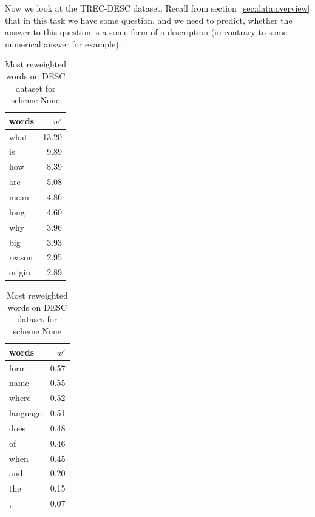     Now we look at the TREC-DESC dataset. 
    Recall from section~\ref{sec:data:overview} that in this task we have some question, and we need to predict, whether the answer to this question is a some form of a description (in contrary to some numerical answer for example).
    
    
    

\begin{table}[H]
    \centering
    \begin{minipage}{.4\linewidth}
      \centering
        \begin{tabular}{lr}
\toprule
  words &   $w'$ \\
\midrule
   what &  13.20 \\
     is &   9.89 \\
    how &   8.39 \\
    are &   5.08 \\
   mean &   4.86 \\
   long &   4.60 \\
    why &   3.96 \\
    big &   3.93 \\
 reason &   2.95 \\
 origin &   2.89 \\
\bottomrule
\end{tabular}

    \end{minipage}
    \begin{minipage}{.4\linewidth}
      \centering
        \begin{tabular}{lr}
\toprule
    words &  $w'$ \\
\midrule
     form &  0.57 \\
     name &  0.55 \\
    where &  0.52 \\
 language &  0.51 \\
     does &  0.48 \\
       of &  0.46 \\
     when &  0.45 \\
      and &  0.20 \\
      the &  0.15 \\
        , &  0.07 \\
\bottomrule
\end{tabular}

    \end{minipage} 
    \caption{Most reweighted words on DESC dataset for scheme None}
    \label{tab:words:TREC:none}
\end{table}

